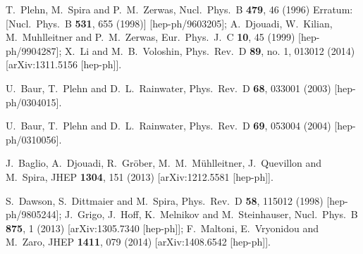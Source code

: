 \documentclass[aps,prd,11pt,tightenlines,superscriptaddress,nofootinbib,preprintnumbers,notitlepage]{revtex4-1}
\begin{document}
\begin{thebibliography}{99}
  T.~Plehn, M.~Spira and P.~M.~Zerwas,
  Nucl.\ Phys.\ B {\bf 479}, 46 (1996)
  Erratum: [Nucl.\ Phys.\ B {\bf 531}, 655 (1998)]
  [hep-ph/9603205];
  A.~Djouadi, W.~Kilian, M.~Muhlleitner and P.~M.~Zerwas,
  Eur.\ Phys.\ J.\ C {\bf 10}, 45 (1999)
  [hep-ph/9904287];
  X.~Li and M.~B.~Voloshin,
  Phys.\ Rev.\ D {\bf 89}, no. 1, 013012 (2014)
  [arXiv:1311.5156 [hep-ph]].

  U.~Baur, T.~Plehn and D.~L.~Rainwater,
  Phys.\ Rev.\ D {\bf 68}, 033001 (2003)
  [hep-ph/0304015].

  U.~Baur, T.~Plehn and D.~L.~Rainwater,
  Phys.\ Rev.\ D {\bf 69}, 053004 (2004)
  [hep-ph/0310056].

  J.~Baglio, A.~Djouadi, R.~Gr\"ober, M.~M.~M\"uhlleitner, J.~Quevillon and M.~Spira,
  JHEP {\bf 1304}, 151 (2013)
  [arXiv:1212.5581 [hep-ph]].

  S.~Dawson, S.~Dittmaier and M.~Spira,
  Phys.\ Rev.\ D {\bf 58}, 115012 (1998)
  [hep-ph/9805244];
  J.~Grigo, J.~Hoff, K.~Melnikov and M.~Steinhauser,
  Nucl.\ Phys.\ B {\bf 875}, 1 (2013)
  [arXiv:1305.7340 [hep-ph]];
  F.~Maltoni, E.~Vryonidou and M.~Zaro,
  JHEP {\bf 1411}, 079 (2014)
  [arXiv:1408.6542 [hep-ph]].


\end{thebibliography}
\end{document}
